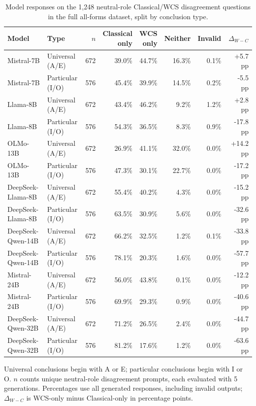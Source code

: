 \begin{table}[htbp]
\centering
\scriptsize
\setlength{\tabcolsep}{3pt}
\caption{Model responses on the 1,248 neutral-role Classical/WCS disagreement questions in the full all-forms dataset, split by conclusion type.}
\label{tab:alignment-by-conclusion-type-final2}
\begin{tabular}{llrrrrrr}
\toprule
Model & Type & $n$ & \shortstack{Classical\\only} & \shortstack{WCS\\only} & Neither & Invalid & $\Delta_{W-C}$ \\
\midrule
Mistral-7B & Universal (A/E) & 672 & 39.0\% & 44.7\% & 16.3\% & 0.1\% & +5.7 pp \\
Mistral-7B & Particular (I/O) & 576 & 45.4\% & 39.9\% & 14.5\% & 0.2\% & -5.5 pp \\
Llama-8B & Universal (A/E) & 672 & 43.4\% & 46.2\% & 9.2\% & 1.2\% & +2.8 pp \\
Llama-8B & Particular (I/O) & 576 & 54.3\% & 36.5\% & 8.3\% & 0.9\% & -17.8 pp \\
OLMo-13B & Universal (A/E) & 672 & 26.9\% & 41.1\% & 32.0\% & 0.0\% & +14.2 pp \\
OLMo-13B & Particular (I/O) & 576 & 47.3\% & 30.1\% & 22.7\% & 0.0\% & -17.2 pp \\
DeepSeek-Llama-8B & Universal (A/E) & 672 & 55.4\% & 40.2\% & 4.3\% & 0.0\% & -15.2 pp \\
DeepSeek-Llama-8B & Particular (I/O) & 576 & 63.5\% & 30.9\% & 5.6\% & 0.0\% & -32.6 pp \\
DeepSeek-Qwen-14B & Universal (A/E) & 672 & 66.2\% & 32.5\% & 1.2\% & 0.1\% & -33.8 pp \\
DeepSeek-Qwen-14B & Particular (I/O) & 576 & 78.1\% & 20.3\% & 1.6\% & 0.0\% & -57.7 pp \\
Mistral-24B & Universal (A/E) & 672 & 56.0\% & 43.8\% & 0.1\% & 0.0\% & -12.2 pp \\
Mistral-24B & Particular (I/O) & 576 & 69.9\% & 29.3\% & 0.9\% & 0.0\% & -40.6 pp \\
DeepSeek-Qwen-32B & Universal (A/E) & 672 & 71.2\% & 26.5\% & 2.4\% & 0.0\% & -44.7 pp \\
DeepSeek-Qwen-32B & Particular (I/O) & 576 & 81.2\% & 17.6\% & 1.2\% & 0.0\% & -63.6 pp \\
\bottomrule
\end{tabular}
\vspace{2pt}
\begin{minipage}{\linewidth}
\scriptsize Universal conclusions begin with A or E; particular conclusions begin with I or O. $n$ counts unique neutral-role disagreement prompts, each evaluated with 5 generations. Percentages use all generated responses, including invalid outputs; $\Delta_{W-C}$ is WCS-only minus Classical-only in percentage points.
\end{minipage}
\end{table}

